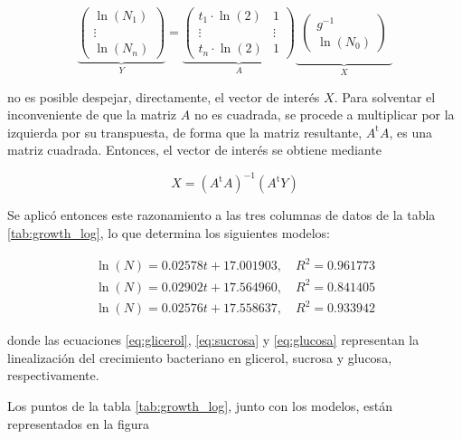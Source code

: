 \[
  \underbrace{
  \left(
    \begin{array}{c}
      \ln(N_1) \\
      \vdots \\
      \ln(N_n)
    \end{array}
  \right)
  }_{\displaystyle Y}
  = 
  \underbrace{
  \left(
    \begin{array}{cc}
      t_1\cdot\ln(2) & 1 \\
      \vdots & \vdots \\
      t_n\cdot\ln(2) & 1
    \end{array}
  \right)}_{\displaystyle A}
  \underbrace{
    \begin{array}{c}
    \\[-4pt]
    \left(
      \begin{array}{c}
        g^{-1} \\
        \ln(N_0)
      \end{array}
    \right) \\[18pt]
  \end{array}}_{\displaystyle X}
\]

no es posible despejar, directamente, el vector de interés $X$. Para solventar el inconveniente de que la matriz $A$ no es cuadrada, se procede a multiplicar por la izquierda por su transpuesta, de forma que la matriz resultante, $A^{\text{t}}A$, es una matriz cuadrada. Entonces, el vector de interés se obtiene mediante

\begin{equation}
  X = (A^{\text{t}}A)^{-1}(A^{\text{t}}Y)
\end{equation}

Se aplicó entonces este razonamiento a las tres columnas de datos de la tabla \ref{tab:growth_log}, lo que determina los siguientes modelos: 

\begin{eqnarray}
  \ln(N) = 0.02578 t + 17.001903, \quad R^2=0.961773 \label{eq:glicerol} \\
  \ln(N) = 0.02902 t + 17.564960, \quad R^2=0.841405 \label{eq:sucrosa} \\
  \ln(N) = 0.02576 t + 17.558637, \quad R^2=0.933942 \label{eq:glucosa}
\end{eqnarray}

donde las ecuaciones \eqref{eq:glicerol}, \eqref{eq:sucrosa} y \eqref{eq:glucosa} representan la linealización del crecimiento bacteriano en glicerol, sucrosa y glucosa, respectivamente.

Los puntos de la tabla \ref{tab:growth_log}, junto con los modelos, están representados en la figura

